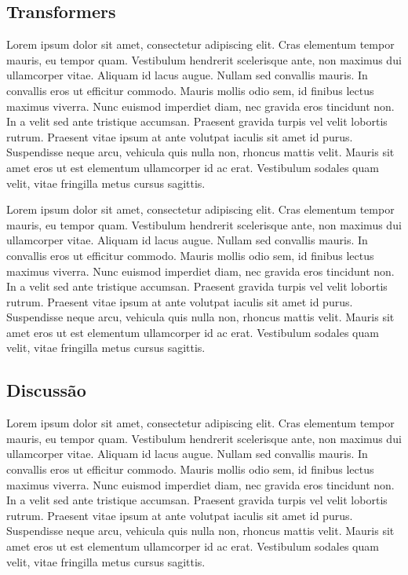 \documentclass[conference]{IEEEtran}
\begin{document}
\subsection{Transformers}

Lorem ipsum dolor sit amet, consectetur adipiscing elit. Cras elementum tempor mauris, eu tempor quam. Vestibulum hendrerit scelerisque ante, non maximus dui ullamcorper vitae. Aliquam id lacus augue. Nullam sed convallis mauris. In convallis eros ut efficitur commodo. Mauris mollis odio sem, id finibus lectus maximus viverra. Nunc euismod imperdiet diam, nec gravida eros tincidunt non. In a velit sed ante tristique accumsan. Praesent gravida turpis vel velit lobortis rutrum. Praesent vitae ipsum at ante volutpat iaculis sit amet id purus. Suspendisse neque arcu, vehicula quis nulla non, rhoncus mattis velit. Mauris sit amet eros ut est elementum ullamcorper id ac erat. Vestibulum sodales quam velit, vitae fringilla metus cursus sagittis.

Lorem ipsum dolor sit amet, consectetur adipiscing elit. Cras elementum tempor mauris, eu tempor quam. Vestibulum hendrerit scelerisque ante, non maximus dui ullamcorper vitae. Aliquam id lacus augue. Nullam sed convallis mauris. In convallis eros ut efficitur commodo. Mauris mollis odio sem, id finibus lectus maximus viverra. Nunc euismod imperdiet diam, nec gravida eros tincidunt non. In a velit sed ante tristique accumsan. Praesent gravida turpis vel velit lobortis rutrum. Praesent vitae ipsum at ante volutpat iaculis sit amet id purus. Suspendisse neque arcu, vehicula quis nulla non, rhoncus mattis velit. Mauris sit amet eros ut est elementum ullamcorper id ac erat. Vestibulum sodales quam velit, vitae fringilla metus cursus sagittis.

\subsection{Discussão}

Lorem ipsum dolor sit amet, consectetur adipiscing elit. Cras elementum tempor mauris, eu tempor quam. Vestibulum hendrerit scelerisque ante, non maximus dui ullamcorper vitae. Aliquam id lacus augue. Nullam sed convallis mauris. In convallis eros ut efficitur commodo. Mauris mollis odio sem, id finibus lectus maximus viverra. Nunc euismod imperdiet diam, nec gravida eros tincidunt non. In a velit sed ante tristique accumsan. Praesent gravida turpis vel velit lobortis rutrum. Praesent vitae ipsum at ante volutpat iaculis sit amet id purus. Suspendisse neque arcu, vehicula quis nulla non, rhoncus mattis velit. Mauris sit amet eros ut est elementum ullamcorper id ac erat. Vestibulum sodales quam velit, vitae fringilla metus cursus sagittis.
\end{document}
